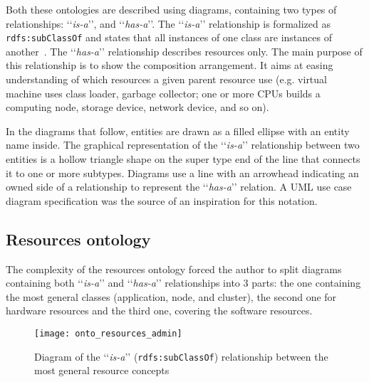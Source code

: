 Both these ontologies are described using diagrams, containing two types of relationships: \lq\lq{}\emph{is-a}\rq\rq{}, and \lq\lq{}\emph{has-a}\rq\rq{}. The \lq\lq{}\emph{is-a}\rq\rq{} relationship is formalized as \texttt{rdfs:subClassOf} and states that all instances of one class are instances of another~\cite{rdfRef:2004}. The \lq\lq{}\emph{has-a}\rq\rq{} relationship describes resources only. The main purpose of this relationship is to show the composition arrangement. It aims at easing understanding of which resources a given parent resource use (e.g. virtual machine uses class loader, garbage collector; one or more CPUs builds a computing node, storage device, network device, and so on).

In the diagrams that follow, entities are drawn as a filled ellipse with an entity name inside. The graphical representation of the \lq\lq{}\emph{is-a}\rq\rq{} relationship between two entities is a hollow triangle shape on the super type end of the line that connects it to one or more subtypes. Diagrams use a line with an arrowhead indicating an owned side of a relationship to represent the \lq\lq{}\emph{has-a}\rq\rq{} relation. A UML use case diagram specification was the source of an inspiration for this notation.

\subsection{Resources ontology}
\label{subsec:arch_knowledge_resources}

The complexity of the resources ontology forced the author to split diagrams containing both \lq\lq{}\emph{is-a}\rq\rq{} and \lq\lq{}\emph{has-a}\rq\rq{} relationships into 3 parts: the one containing the most general classes (application, node, and cluster), the second one for hardware resources and the third one, covering the software resources. 

\begin{figure}[ht]
\centering
\texttt{[image: onto\_resources\_admin]}
\caption{Diagram of the \lq\lq{}\emph{is-a}\rq\rq{} (\texttt{rdfs:subClassOf}) relationship between the most general resource concepts}
\label{fig:onto_resources_admin}
\end{figure}

